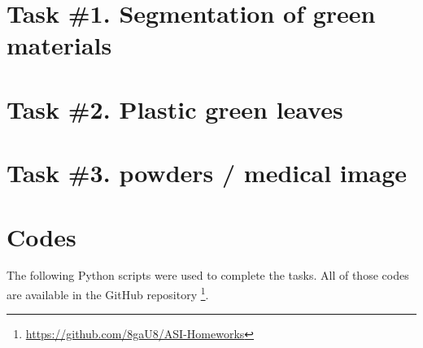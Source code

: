 \section{Task \#1. Segmentation of green materials}






\section{Task \#2. Plastic green leaves}





\section{Task \#3. powders / medical image}

% 


\section{Codes}
The following Python scripts were used to complete the tasks. All of
those codes are available in the GitHub repository
\footnote{\url{https://github.com/8gaU8/ASI-Homeworks}}.










